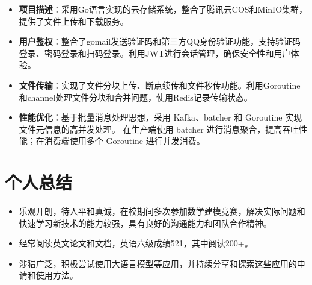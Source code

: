 \documentclass{resume}
\begin{document}
\begin{itemize}
    \item \textbf{项目描述}：采用Go语言实现的云存储系统，整合了腾讯云COS和MinIO集群，提供了文件上传和下载服务。
    \item \textbf{用户鉴权}：整合了gomail发送验证码和第三方QQ身份验证功能，支持验证码登录、密码登录和扫码登录。利用JWT进行会话管理，确保安全性和用户体验。
    \item \textbf{文件传输}：实现了文件分块上传、断点续传和文件秒传功能。利用Goroutine和channel处理文件分块和合并问题，使用Redis记录传输状态。
    \item \textbf{性能优化}：基于批量消息处理思想，采用 Kafka、batcher 和 Goroutine 实现文件元信息的高并发处理。
    在生产端使用 batcher 进行消息聚合，提高吞吐性能；在消费端使用多个 Goroutine 进行并发消费。
\end{itemize}

\section{个人总结}
\begin{itemize}
  \item 乐观开朗，待人平和真诚，在校期间多次参加数学建模竞赛，解决实际问题和快速学习新技术的能力较强，具有良好的沟通能力和团队合作精神。
  \item 经常阅读英文论文和文档，英语六级成绩521，其中阅读200+。
  \item 涉猎广泛，积极尝试使用大语言模型等应用，并持续分享和探索这些应用的申请和使用方法。
\end{itemize}
\end{document}

